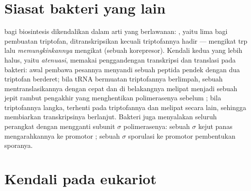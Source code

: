 \section{Siasat bakteri yang lain}

\begin{proposition}\label{prop:b1:expression-control:trp}
 bagi biosintesis dikendalikan dalam arti yang berlawanan:
\emph{}, yaitu lima  bagi pembuatan triptofan,
ditranskripsikan kecuali triptofannya hadir ---  mengikat
 trp lalu \emph{memungkinkannya} mengikat  (sebuah
korepresor). Kendali kedua yang lebih halus, yaitu \emph{atenuasi},
memakai penggandengan transkripsi dan translasi pada bakteri: awal
pembawa pesannya menyandi sebuah peptida pendek dengan dua triptofan
berderet; bila tRNA bermuatan triptofannya berlimpah, sebuah 
mentranslasikannya dengan cepat dan  di belakangnya melipat menjadi
sebuah jepit rambut pengakhir yang menghentikan polimerasenya sebelum
; bila triptofannya langka,  terhenti pada 
triptofannya dan  melipat secara lain, sehingga membiarkan
transkripsinya berlanjut. Bakteri juga menyalakan seluruh perangkat 
dengan mengganti subunit $\sigma$ polimerasenya: sebuah $\sigma$ kejut
panas mengarahkannya ke promotor  ; sebuah
$\sigma$ sporulasi ke promotor pembentukan sporanya.
\end{proposition}

\section{Kendali pada eukariot}

